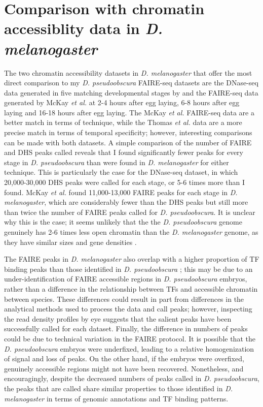 \section{Comparison with chromatin accessiblity data in \emph{D. melanogaster}}
The two chromatin accessibility datasets in \emph{D. melanogaster} that offer the most direct comparison to my \emph{D. pseudoobscura} FAIRE-seq datasets are the DNase-seq data generated in five matching developmental stages by \citet{thomas_dynamic_2011} and the FAIRE-seq data generated by McKay \emph{et al.} \citep{mckay_common_2013} at 2-4 hours after egg laying, 6-8 hours after egg laying and 16-18 hours after egg laying. The McKay \emph{et al.} FAIRE-seq data are a better match in terms of technique, while the Thomas \emph{et al.} data are a more precise match in terms of temporal specificity; however, interesting comparisons can be made with both datasets. A simple comparison of the number of FAIRE and DHS peaks called reveals that I found significantly fewer peaks for every stage in \emph{D. pseudoobscura} than were found in \emph{D. melanogaster} for either technique. This is particularly the case for the DNase-seq dataset, in which 20,000-30,000 DHS peaks were called for each stage, or 5-6 times more than I found. McKay \emph{et al.} found 11,000-13,000 FAIRE peaks for each stage in \emph{D. melanogaster}, which are considerably fewer than the DHS peaks but still more than twice the number of FAIRE peaks called for \emph{D. pseudoobscura}. It is unclear why this is the case; it seems unlikely that the the \emph{D. pseudoobscura} genome genuinely has 2-6 times less open chromatin than the \emph{D. melanogaster} genome, as they have similar sizes and gene densities \citep{richards_comparative_2005}. 

The FAIRE peaks in \emph{D. melanogaster} also overlap with a higher proportion of TF binding peaks than those identified in \emph{D. pseudoobscura} \citep{mckay_common_2013}; this may be due to an under-identification of FAIRE accessible regions in \emph{D. pseudoobscura} embryos, rather than a difference in the relationship between TFs and accessible chromatin between species. These differences could result in part from differences in the analytical methods used to process the data and call peaks; however, inspecting the read density profiles by eye suggests that the salient peaks have been successfully called for each dataset. Finally, the difference in numbers of peaks could be due to technical variation in the FAIRE protocol. It is possible that the \emph{D. pseudoobscura} embryos were underfixed, leading to a relative homogenization of signal and loss of peaks. On the other hand, if the embryos were overfixed, genuinely accessible regions might not have been recovered. Nonetheless, and encouragingly, despite the decreased numbers of peaks called in \emph{D. pseudoobscura}, the peaks that are called share similar properties to those identified in \emph{D. melanogaster} in terms of genomic annotations and TF binding patterns.

